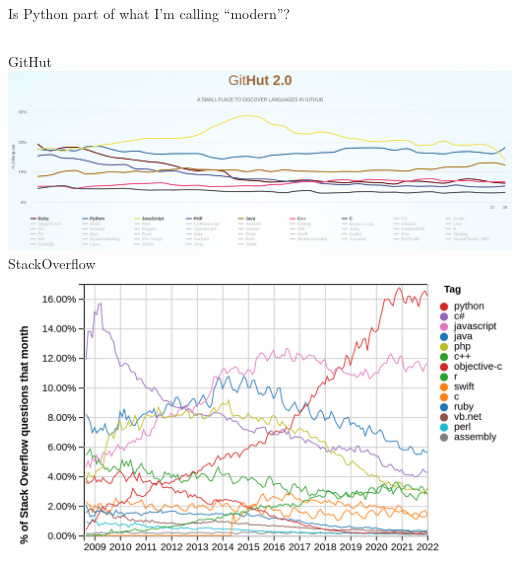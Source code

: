 \documentclass[aspectratio=169]{beamer}
\begin{document}
\begin{frame}{Is Python part of what I'm calling ``modern''?}
\vspace{0.25 cm}
\begin{columns}[t]
\centering GitHut
\vspace{0.1 cm}
\includegraphics[width=\linewidth]{PLOTS/python-rankings-githut-2022.png}
\centering StackOverflow
\vspace{0.1 cm}
\includegraphics[width=\linewidth]{PLOTS/python-rankings-stackoverflow-2022.png}
\end{columns}
\end{frame}
\end{document}
